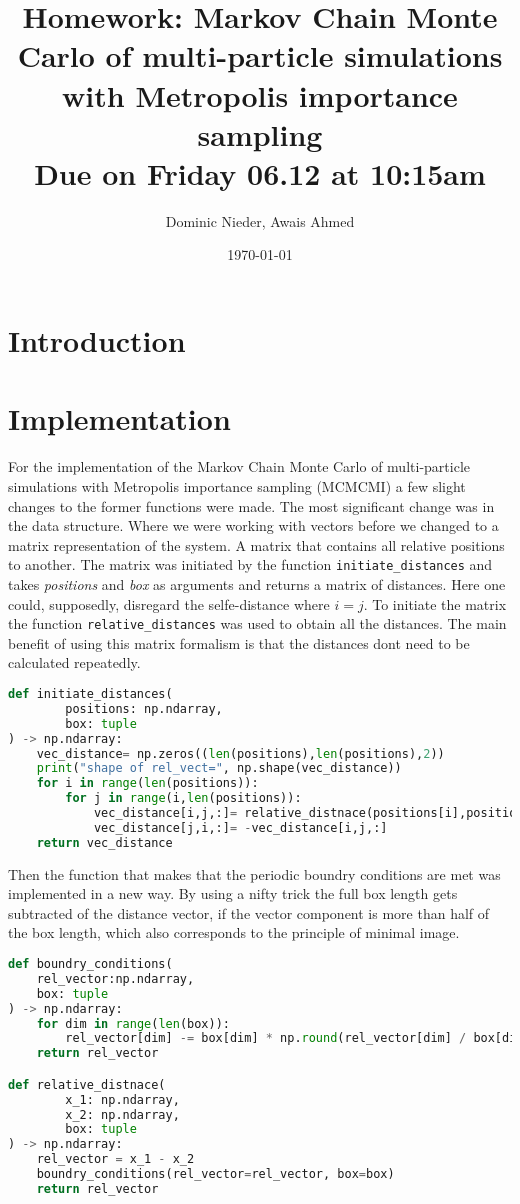 \documentclass{article}[a4paper]
\title{
    \vspace{2in}
    \textmd{\textbf{Homework: Markov Chain Monte Carlo of multi-particle simulations with Metropolis importance sampling}}\\
    \normalsize\vspace{0.1in}\small{Due on Friday 06.12 at 10:15am}\\
    \vspace{0.1in}
    \vspace{3in}
}
\author{Dominic Nieder, Awais Ahmed}
\date{\today}
\begin{document}
\section{Introduction}

\section{Implementation}

For the implementation of the Markov Chain Monte Carlo of multi-particle simulations with Metropolis importance sampling (MCMCMI) a few slight changes to the former functions were made.
The most significant change was in the data structure.
Where we were working with vectors before we changed to a matrix representation of the system. 
A matrix that contains all relative positions to another. 
The matrix was initiated by the function \texttt{initiate\_distances} and takes \textit{positions} and \textit{box} as arguments and returns a matrix of distances. 
Here one could, supposedly, disregard the selfe-distance where $i=j$.
To initiate the matrix the function \texttt{relative\_distances} was used to obtain all the distances.
The main benefit of using this matrix formalism is that the distances dont need to be calculated repeatedly.
\begin{lstlisting}[language=Python]
def initiate_distances(
        positions: np.ndarray,
        box: tuple
) -> np.ndarray:
    vec_distance= np.zeros((len(positions),len(positions),2))
    print("shape of rel_vect=", np.shape(vec_distance))
    for i in range(len(positions)):
        for j in range(i,len(positions)):
            vec_distance[i,j,:]= relative_distnace(positions[i],positions[j], box=box)
            vec_distance[j,i,:]= -vec_distance[i,j,:]
    return vec_distance
\end{lstlisting}

Then the function that makes that the periodic boundry conditions are met was implemented in a new way. By using a nifty trick the full box length gets subtracted of the distance vector, if the vector component is more than half of the box length, which also corresponds to the principle of minimal image.
\begin{lstlisting}[language=Python]
def boundry_conditions(
    rel_vector:np.ndarray,
    box: tuple
) -> np.ndarray:
    for dim in range(len(box)):
        rel_vector[dim] -= box[dim] * np.round(rel_vector[dim] / box[dim])
    return rel_vector

def relative_distnace(
        x_1: np.ndarray, 
        x_2: np.ndarray, 
        box: tuple
) -> np.ndarray:
    rel_vector = x_1 - x_2
    boundry_conditions(rel_vector=rel_vector, box=box)
    return rel_vector 
\end{lstlisting}
\end{document}

